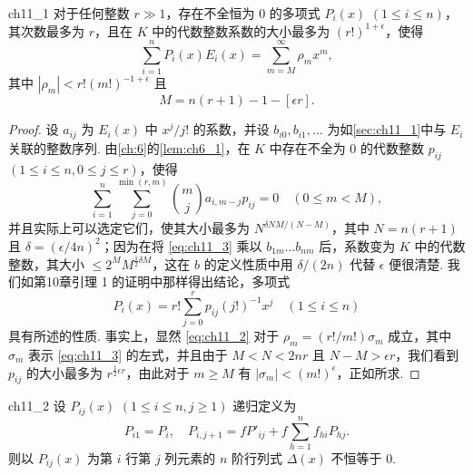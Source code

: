\begin{mylemma}{}{ch11_1}
对于任何整数 $r \gg 1$，存在不全恒为 0 的多项式 $P_i(x)$ $(1 \leqslant i \leqslant n)$，其次数最多为 $r$，且在 $K$ 中的代数整数系数的大小最多为 $(r!)^{1+\epsilon}$，使得
\[\sum_{i=1}^{n} P_i(x) E_i(x) = \sum_{m=M}^{\infty} \rho_m x^m, \tag{2}\label{eq:ch11_2}\]
其中 $|\rho_m| < r! (m!)^{-1+\epsilon}$ 且
\[M = n(r+1) - 1 - [\epsilon r].\]
\end{mylemma}

\begin{proof}
设 $a_{ij}$ 为 $E_i(x)$ 中 $x^j/j!$ 的系数，并设 $b_{i0}, b_{i1}, \ldots$ 为如\autoref{sec:ch11_1}中与 $E_i$ 关联的整数序列. 由\autoref{ch:6}的\autoref{lem:ch6_1}，在 $K$ 中存在不全为 0 的代数整数 $p_{ij}$ $(1 \le i \le n, 0 \le j \le r)$，使得
\[\sum_{i=1}^{n} \sum_{j=0}^{\min(r, m)} \binom{m}{j} a_{i, m-j} p_{ij} = 0 \quad (0 \le m < M), \tag{3}\label{eq:ch11_3}\]
并且实际上可以选定它们，使其大小最多为 $N^{\delta NM/(N-M)}$，其中 $N=n(r+1)$ 且 $\delta=(\epsilon/4n)^2$；因为在将 \eqref{eq:ch11_3} 乘以 $b_{1m}\dots b_{nm}$ 后，系数变为 $K$ 中的代数整数，其大小 $\leq 2^M M^{\frac{1}{2}\delta M}$，这在 $b$ 的定义性质中用 $\delta/(2n)$ 代替 $\epsilon$ 便很清楚. 我们如第10章引理 1 的证明中那样得出结论，多项式
\[P_i(x) = r! \sum_{j=0}^{r} p_{ij}(j!)^{-1} x^j \quad (1 \le i \le n)\]
具有所述的性质. 事实上，显然 \eqref{eq:ch11_2} 对于 $\rho_m = (r!/m!)\sigma_m$ 成立，其中 $\sigma_m$ 表示 \eqref{eq:ch11_3} 的左式，并且由于 $M < N < 2nr$ 且 $N - M > \epsilon r$，我们看到 $p_{ij}$ 的大小最多为 $r^{\frac{1}{2}\epsilon r}$，由此对于 $m \ge M$ 有 $|\sigma_m| < (m!)^{\epsilon}$，正如所求.
\end{proof}

\begin{mylemma}{}{ch11_2}
设 $P_{ij}(x)$ $(1 \le i \le n, j \ge 1)$ 递归定义为
\[P_{i1} = P_i, \quad P_{i,j+1} = f P'_{ij} + f \sum_{h=1}^{n} f_{hi} P_{hj}.\]
则以 $P_{ij}(x)$ 为第 $i$ 行第 $j$ 列元素的 $n$ 阶行列式 $\Delta(x)$ 不恒等于 0.
\end{mylemma}

